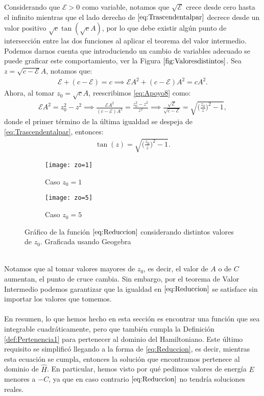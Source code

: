 \documentclass[12pt]{article}
\theoremstyle{definition}
\begin{document}
\noindent
Considerando que  $\mathcal{E}>0$ como variable, notamos que $\sqrt{\mathcal{E}}$ crece desde cero hasta el infinito mientras que el lado derecho de $\eqref{eq:Trascendentalpar}$ decrece desde un valor positivo $\sqrt{c}\tan(\sqrt{c}A)$,
 por lo que debe existir algún punto de intersección entre las dos funciones al aplicar el teorema del valor intermedio. Podemos darnos cuenta que introduciendo un cambio de variables adecuado se puede graficar este comportamiento, ver la Figura $\ref{fig:Valoresdistintos}$. Sea $z = \sqrt{c-\mathcal{E}}A$, notamos que:
\begin{align}
    \mathcal{E} + (c - \mathcal{E}) = c 
    \implies
    \mathcal{E}A^2 + (c - \mathcal{E})A^2 = cA^2.
    \label{eq:Apoyo8}
\end{align}
Ahora, al tomar $z_{0} = \sqrt{c}A $, reescribimos \eqref{eq:Apoyo8} como:
\begin{align*}
    \mathcal{E}A^2 = z_{0}^2 - z^2 \implies 
    \frac{\mathcal{E}A^2}{(c-\mathcal{E})A^2} = \frac{z_{0}^2-z^2}{z^2}
    \implies
    \frac{\sqrt{\mathcal{E}}}{\sqrt{c-\mathcal{E}}} = \sqrt{\bigg(\frac{z_{0}}{z}\bigg)^2 - 1},
\end{align*}
donde el primer término de la última igualdad se despeja de \eqref{eq:Trascendentalpar}, entonces:
\begin{align}
    \tan(z) = \sqrt{\bigg(\frac{z_{0}}{z}\bigg)^2 - 1}.
    \label{eq:Reduccion}
\end{align}
\begin{figure}[h]
\begin{subfigure}{0.5\textwidth}
\texttt{[image: zo=1]}
\caption{Caso $z_{0}=1$}
\label{fig:z0menor}
\end{subfigure}
\begin{subfigure}{0.5\textwidth}
\texttt{[image: zo=5]}
\caption{Caso $z_{0}=5$}
\label{fig:z0mayor}
\end{subfigure}
\caption{Gráfico de la función $\eqref{eq:Reduccion}$ considerando distintos valores de $z_{0}$. Graficada usando Geogebra}
\label{fig:Valoresdistintos}
\end{figure}
\\
\noindent 
Notamos que al tomar valores mayores de $z_{0}$, es decir, el valor de $A$ o de $C$ aumentan, el punto de cruce cambia. Sin embargo, por el teorema de Valor Intermedio podemos garantizar que la igualdad en $\eqref{eq:Reduccion}$ se satisface sin importar los valores que tomemos.
\\ \\
En resumen, lo que hemos hecho en esta sección es encontrar una función que sea integrable cuadráticamente, pero que también cumpla la Definición \eqref{def:Pertenencia1} para pertenecer al dominio del
Hamiltoniano. Este último requisito se simplificó llegando a la forma de \eqref{eq:Reduccion}, es decir, mientras esta ecuación se cumpla, entonces la solución que encontramos pertenece al dominio de $\hat{H}$. En particular, hemos visto por qué pedimos valores de energía $E$ menores a $-C$, ya que en caso contrario $\eqref{eq:Reduccion}$ no tendría soluciones reales.
\end{document}
